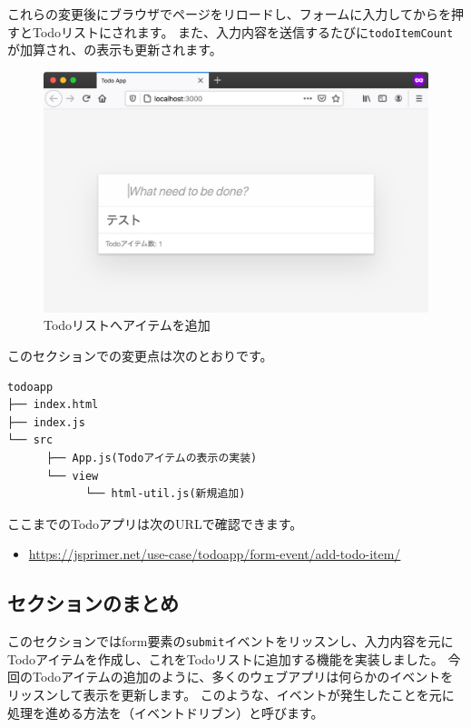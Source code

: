 これらの変更後にブラウザでページをリロードし、フォームに入力してからを押すとTodoリストに\textbf{}されます。
また、入力内容を送信するたびに\texttt{todoItemCount}が加算され、\textbf{}の表示も更新されます。
\newpage
\begin{figure}[h]
\centering
\includegraphics[width=120mm]{./fig/add-todo-item.pdf}
\caption{Todoリストへアイテムを追加}
\end{figure}

このセクションでの変更点は次のとおりです。

\begin{lstlisting}
todoapp
├── index.html
├── index.js
└── src
      ├── App.js(Todoアイテムの表示の実装)
      └── view
            └── html-util.js(新規追加)
\end{lstlisting}

ここまでのTodoアプリは次のURLで確認できます。

\begin{itemize}
\item
  \url{https://jsprimer.net/use-case/todoapp/form-event/add-todo-item/}
\end{itemize}

\hypertarget{conclusion}{%
\subsection{セクションのまとめ}\label{conclusion}}

このセクションではform要素の\texttt{submit}イベントをリッスンし、入力内容を元にTodoアイテムを作成し、これをTodoリストに追加する機能を実装しました。
今回のTodoアイテムの追加のように、多くのウェブアプリは何らかのイベントをリッスンして表示を更新します。
このような、イベントが発生したことを元に処理を進める方法を\textbf{}（イベントドリブン）と呼びます。

